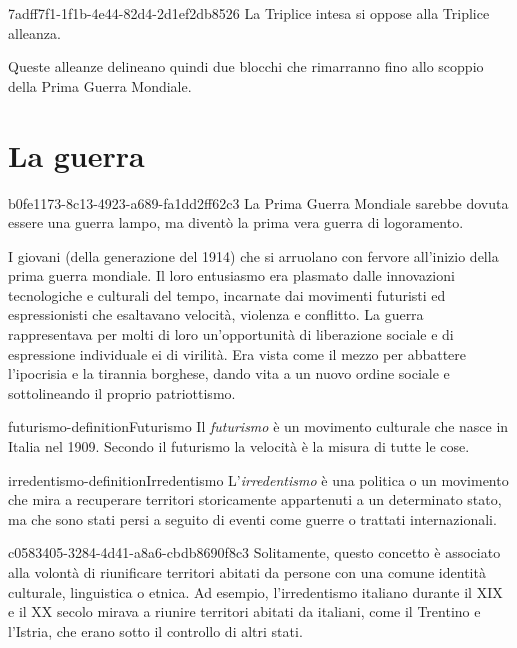 \documentclass[preview]{standalone}
\begin{document}
\begin{snippet}{7adff7f1-1f1b-4e44-82d4-2d1ef2db8526}
    La Triplice intesa si oppose alla Triplice alleanza.

    Queste alleanze delineano quindi due blocchi che rimarranno fino allo scoppio della Prima
    Guerra Mondiale.
    
\end{snippet}

\section{La guerra}

\begin{snippet}{b0fe1173-8c13-4923-a689-fa1dd2ff62c3}
    La Prima Guerra Mondiale sarebbe dovuta essere una guerra lampo, ma diventò la prima
    vera guerra di logoramento.
    
    I giovani (della generazione del 1914) che si arruolano con fervore
    all'inizio della prima guerra mondiale.
    Il loro entusiasmo era plasmato dalle innovazioni tecnologiche e culturali del tempo,
    incarnate dai movimenti futuristi ed espressionisti che esaltavano velocità,
    violenza e conflitto.
    La guerra rappresentava per molti di loro un'opportunità di liberazione sociale e
    di espressione individuale ei di virilità.
    Era vista come il mezzo per abbattere l'ipocrisia e la tirannia borghese,
    dando vita a un nuovo ordine sociale e sottolineando il proprio patriottismo.
\end{snippet}

\begin{snippetdefinition}{futurismo-definition}{Futurismo}
    Il \textit{futurismo} è un movimento culturale che nasce in Italia nel
    1909. Secondo il futurismo la velocità è la misura di tutte le cose.
\end{snippetdefinition}

\begin{snippetdefinition}{irredentismo-definition}{Irredentismo}
    L'\textit{irredentismo} è una politica o un movimento che 
    mira a recuperare territori storicamente appartenuti a un determinato stato,
    ma che sono stati persi a seguito di eventi come guerre o trattati internazionali.
\end{snippetdefinition}

\begin{snippet}{c0583405-3284-4d41-a8a6-cbdb8690f8c3}
    Solitamente, questo concetto è associato alla volontà di riunificare territori
    abitati da persone con una comune identità culturale, linguistica o etnica.
    Ad esempio, l'irredentismo italiano durante il XIX e il XX secolo mirava a
    riunire territori abitati da italiani, come il Trentino e l'Istria, che erano
    sotto il controllo di altri stati.

\end{snippet}
\end{document}
